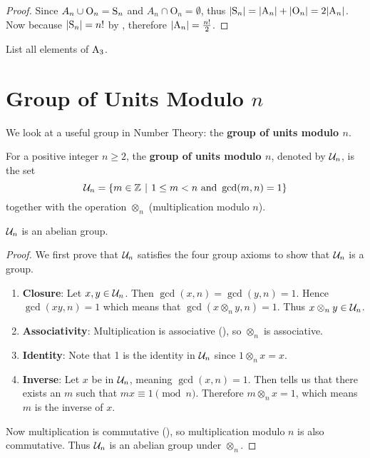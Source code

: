 \begin{proof}
    Since $A_n \cup \mathrm{O}_n = \mathrm{S}_{n}$ and $A_n \cap \mathrm{O}_n = \emptyset$, thus $|\mathrm{S}_{n}| = |\mathrm{A}_{n}| + |\mathrm{O}_n| = 2|\mathrm{A}_{n}|$. Now because $|\mathrm{S}_{n}| = n!$ by , therefore $|\mathrm{A}_{n}| = \frac{n!}2$.
\end{proof}

\begin{exercise}
    List all elements of $\mathrm{A}_{3}$.
\end{exercise}

\section{Group of Units Modulo $n$}\label{section-group-of-units-mod-n}
We look at a useful group in Number Theory: the \textbf{group of units modulo $n$}.

\begin{definition}
    For a positive integer $n \geq 2$, the \textbf{group of units modulo $n$}, denoted by $\mathcal{U}_{n}$, is the set
    \[
        \Un{n} = \{m \in \Z \vert 1 \leq m < n \text{ and } \gcd(m, n) = 1\}
    \]
    together with the operation $\otimes_n$ (multiplication modulo $n$).
\end{definition}

\begin{proposition}
    $\mathcal{U}_{n}$ is an abelian group.
\end{proposition}
\begin{proof}
    We first prove that $\mathcal{U}_{n}$ satisfies the four group axioms to show that $\mathcal{U}_{n}$ is a group.
    \begin{enumerate}
        \item \textbf{Closure}: Let $x, y \in \mathcal{U}_{n}$. Then $\gcd(x, n) = \gcd(y, n) = 1$. Hence $\gcd(xy, n) = 1$ which means that $\gcd(x\otimes_ny,n)=1$. Thus $x\otimes_ny \in \mathcal{U}_{n}$.

        \item \textbf{Associativity}: Multiplication is associative (), so $\otimes_n$ is associative.

        \item \textbf{Identity}: Note that 1 is the identity in $\mathcal{U}_{n}$ since $1 \otimes_n x = x$.

        \item \textbf{Inverse}: Let $x$ be in $\mathcal{U}_{n}$, meaning $\gcd(x, n) = 1$. Then  tells us that there exists an $m$ such that $mx \equiv 1 \pmod n$. Therefore $m \otimes_n x = 1$, which means $m$ is the inverse of $x$.
    \end{enumerate}
    Now multiplication is commutative (), so multiplication modulo $n$ is also commutative. Thus $\mathcal{U}_{n}$ is an abelian group under $\otimes_n$.
\end{proof}

